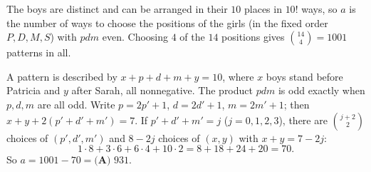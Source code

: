 The boys are distinct and can be arranged in their $10$ places in $10!$ ways, so $a$ is the number of ways to choose the positions of the girls (in the fixed order $P,D,M,S$) with $pdm$ even. Choosing $4$ of the $14$ positions gives $\binom{14}4=1001$ patterns in all.

A pattern is described by $x+p+d+m+y=10$, where $x$ boys stand before Patricia and $y$ after Sarah, all nonnegative. The product $pdm$ is odd exactly when $p,d,m$ are all odd. Write $p=2p'+1$, $d=2d'+1$, $m=2m'+1$; then $x+y+2(p'+d'+m')=7$. If $p'+d'+m'=j$ ($j=0,1,2,3$), there are $\binom{j+2}2$ choices of $(p',d',m')$ and $8-2j$ choices of $(x,y)$ with $x+y=7-2j$:
\[
1\cdot8+3\cdot6+6\cdot4+10\cdot2=8+18+24+20=70 .
\]
So $a=1001-70=\boxed{\textbf{(A) }931}$.
